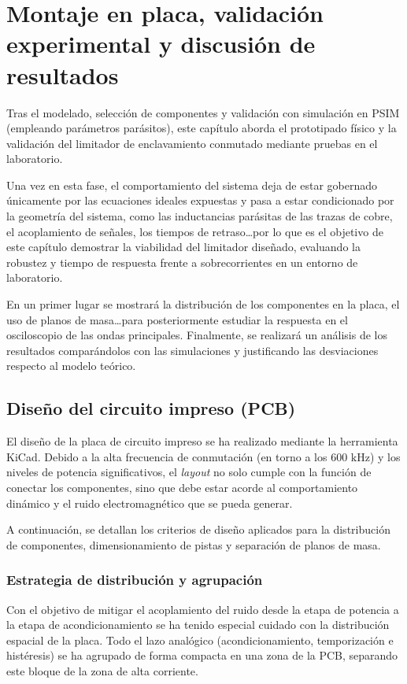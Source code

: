\documentclass[12pt]{report} %
\begin{document}
\chapter{Montaje en placa, validación experimental y discusión de resultados}
\label{ch:montaje_y_resultados}
Tras el modelado, selección de componentes y validación con simulación en PSIM (empleando parámetros parásitos), este capítulo aborda el prototipado físico y la validación del limitador de enclavamiento conmutado mediante pruebas en el laboratorio.

Una vez en esta fase, el comportamiento del sistema deja de estar gobernado únicamente por las ecuaciones ideales expuestas y pasa a estar condicionado por la geometría del sistema, como las inductancias parásitas de las trazas de cobre, el acoplamiento de señales, los tiempos de retraso\dots por lo que es el objetivo de este capítulo demostrar la viabilidad del limitador diseñado, evaluando la robustez y tiempo de respuesta frente a sobrecorrientes en un entorno de laboratorio. 

En un primer lugar se mostrará la distribución de los componentes en la placa, el uso de planos de masa\dots para posteriormente estudiar la respuesta en el osciloscopio de las ondas principales. Finalmente, se realizará un análisis de los resultados comparándolos con las simulaciones y justificando las desviaciones respecto al modelo teórico. 
\section{Diseño del circuito impreso (PCB)}

El diseño de la placa de circuito impreso se ha realizado mediante la herramienta KiCad. Debido a la alta frecuencia de conmutación (en torno a los $600\text{ kHz}$) y los niveles de potencia significativos, el \textit{layout} no solo cumple con la función de conectar los componentes, sino que debe estar acorde al comportamiento dinámico y el ruido electromagnético que se pueda generar. 

A continuación, se detallan los criterios de diseño aplicados para la distribución de componentes, dimensionamiento de pistas y separación de planos de masa.

\subsection{Estrategia de distribución y agrupación}

Con el objetivo de mitigar el acoplamiento del ruido desde la etapa de potencia a la etapa de acondicionamiento se ha tenido especial cuidado con la distribución espacial de la placa. Todo el lazo analógico (acondicionamiento, temporización e histéresis) se ha agrupado de forma compacta en una zona de la PCB, separando este bloque de la zona de alta corriente. 
\end{document}
